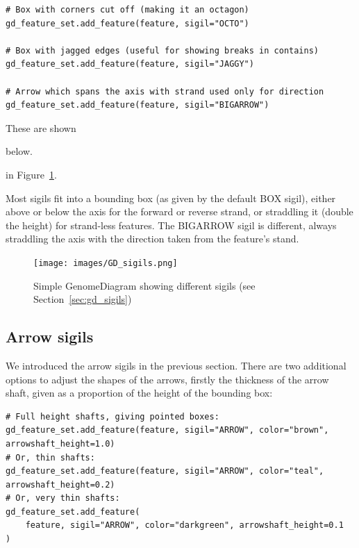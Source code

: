 \begin{verbatim}
# Box with corners cut off (making it an octagon)
gd_feature_set.add_feature(feature, sigil="OCTO")

# Box with jagged edges (useful for showing breaks in contains)
gd_feature_set.add_feature(feature, sigil="JAGGY")

# Arrow which spans the axis with strand used only for direction
gd_feature_set.add_feature(feature, sigil="BIGARROW")
\end{verbatim}

These are shown
\begin{htmlonly}
below.
\end{htmlonly}
\begin{latexonly}in Figure~\ref{fig:gd_sigils}.
\end{latexonly}
Most sigils fit into a bounding box (as given by the default BOX sigil),
either above or below the axis for the forward or reverse strand, or
straddling it (double the height) for strand-less features.
The BIGARROW sigil is different, always straddling the axis with the
direction taken from the feature's stand.

\begin{htmlonly}
\end{htmlonly}
\begin{latexonly}
\begin{figure}[htbp]
\centering
\texttt{[image: images/GD\_sigils.png]}
\caption{Simple GenomeDiagram showing different sigils
(see Section~\ref{sec:gd_sigils})}
\label{fig:gd_sigils}
\end{figure}
\end{latexonly}

\subsection{Arrow sigils}
\label{sec:gd_arrow_sigils}

We introduced the arrow sigils in the previous section.
There are two additional options to adjust the shapes of the arrows, firstly
the thickness of the arrow shaft, given as a proportion of the height of the
bounding box:

\begin{verbatim}
# Full height shafts, giving pointed boxes:
gd_feature_set.add_feature(feature, sigil="ARROW", color="brown", arrowshaft_height=1.0)
# Or, thin shafts:
gd_feature_set.add_feature(feature, sigil="ARROW", color="teal", arrowshaft_height=0.2)
# Or, very thin shafts:
gd_feature_set.add_feature(
    feature, sigil="ARROW", color="darkgreen", arrowshaft_height=0.1
)
\end{verbatim}

